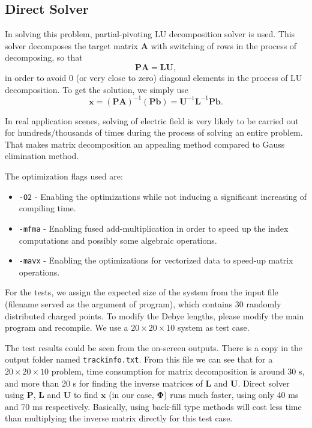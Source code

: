 \documentclass{article}
\begin{document}
\begin{spacing}{1.1}
\subsection{Direct Solver}

In solving this problem, partial-pivoting LU decomposition solver is used. This solver decomposes the target matrix $\mathbf{A}$ with switching of rows in the process of decomposing, so that
\[\mathbf{PA = LU},\]
in order to avoid 0 (or very close to zero) diagonal elements in the process of LU decomposition. To get the solution, we simply use
\[\mathbf{x}=(\mathbf{PA})^{-1}(\mathbf{Pb})=\mathbf{U}^{-1}\mathbf{L}^{-1}\mathbf{Pb}.\]

In real application scenes, solving of electric field is very likely to be carried out for hundreds/thousands of times during the process of solving an entire problem. That makes matrix decomposition an appealing method compared to Gauss elimination method.

The optimization flags used are:
\begin{itemize}
    \item \texttt{-O2} - Enabling the optimizations while not inducing a significant increasing of compiling time.
    \item \texttt{-mfma} - Enabling fused add-multiplication in order to speed up the index computations and possibly some algebraic operations.
    \item \texttt{-mavx} - Enabling the optimizations for vectorized data to speed-up matrix operations.
\end{itemize}

For the tests, we assign the expected size of the system from the input file (filename served as the argument of program), which contains 30 randomly distributed charged points. To modify the Debye lengths, please modify the main program and recompile. We use a $20\times 20\times 10$ system as test case.

The test results could be seen from the on-screen outputs. There is a copy in the output folder named \texttt{trackinfo.txt}. From this file we can see that for a $20\times 20\times 10$ problem, time consumption for matrix decomposition is around 30 s, and more than 20 s for finding the inverse matrices of $\mathbf{L}$ and $\mathbf{U}$. Direct solver using $\mathbf{P}$, $\mathbf{L}$ and $\mathbf{U}$ to find $\mathbf{x}$ (in our case, $\mathbf{\Phi}$) runs much faster, using only 40 ms and 70 ms respectively. Basically, using back-fill type methods will cost less time than multiplying the inverse matrix directly for this test case.


\end{spacing}
\end{document}
